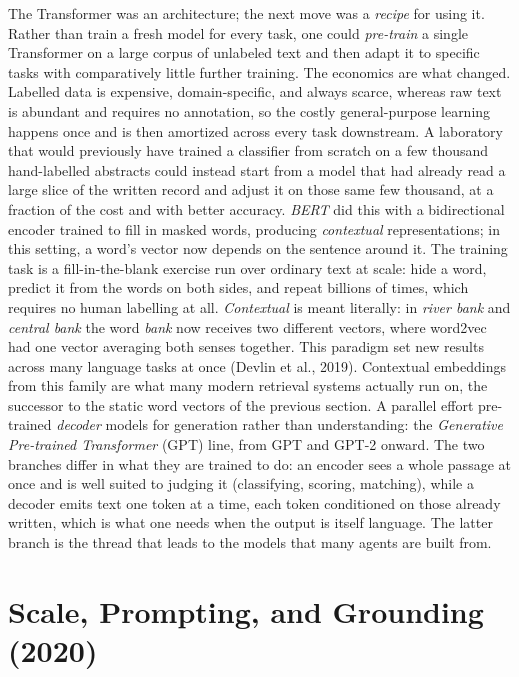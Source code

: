 The Transformer was an architecture; the next move was a \emph{recipe} for using it.
Rather than train a fresh model for every task, one could \emph{pre-train} a single Transformer on a large corpus of unlabeled text and then adapt it to specific tasks with comparatively little further training.
The economics are what changed.
Labelled data is expensive, domain-specific, and always scarce, whereas raw text is abundant and requires no annotation, so the costly general-purpose learning happens once and is then amortized across every task downstream.
A laboratory that would previously have trained a classifier from scratch on a few thousand hand-labelled abstracts could instead start from a model that had already read a large slice of the written record and adjust it on those same few thousand, at a fraction of the cost and with better accuracy.
\emph{BERT} did this with a bidirectional encoder trained to fill in masked words, producing \emph{contextual} representations; in this setting, a word's vector now depends on the sentence around it.
The training task is a fill-in-the-blank exercise run over ordinary text at scale: hide a word, predict it from the words on both sides, and repeat billions of times, which requires no human labelling at all.
\emph{Contextual} is meant literally: in \emph{river bank} and \emph{central bank} the word \emph{bank} now receives two different vectors, where word2vec had one vector averaging both senses together.
This paradigm set new results across many language tasks at once (Devlin et al., 2019).
Contextual embeddings from this family are what many modern retrieval systems actually run on, the successor to the static word vectors of the previous section.
A parallel effort pre-trained \emph{decoder} models for generation rather than understanding: the \emph{Generative Pre-trained Transformer} (GPT) line, from GPT and GPT-2 onward.
The two branches differ in what they are trained to do: an encoder sees a whole passage at once and is well suited to judging it (classifying, scoring, matching), while a decoder emits text one token at a time, each token conditioned on those already written, which is what one needs when the output is itself language.
The latter branch is the thread that leads to the models that many agents are built from.

\section{Scale, Prompting, and Grounding (2020)}
\label{section:ScaleAndGrounding}

